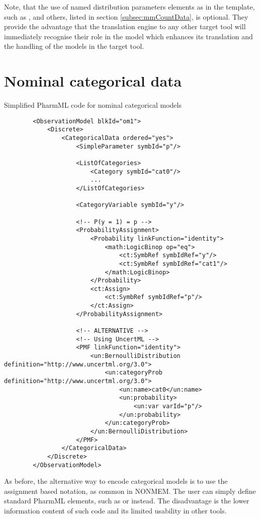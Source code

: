 Note, that the use of named distribution parameters elements as in the template, 
such as ,  and others, listed in section 
\ref{subsec:mmCountData}, is optional. 
They provide the advantage that the translation engine to any other target tool will immediately 
recognise their role in the model which enhances its translation and the handling of the models in the 
target tool.

\section{Nominal categorical data}
Simplified PharmML code for nominal categorical models
\lstset{language=XML}
\begin{lstlisting}
        <ObservationModel blkId="om1">
            <Discrete>
                <CategoricalData ordered="yes">
                    <SimpleParameter symbId="p"/>
                    
                    <ListOfCategories> 
                        <Category symbId="cat0"/>
                        ...
                    </ListOfCategories>
                    
                    <CategoryVariable symbId="y"/>
                    
                    <!-- P(y = 1) = p -->
                    <ProbabilityAssignment>
                        <Probability linkFunction="identity">
                            <math:LogicBinop op="eq">
                                <ct:SymbRef symbIdRef="y"/>
                                <ct:SymbRef symbIdRef="cat1"/>
                            </math:LogicBinop>
                        </Probability>
                        <ct:Assign>
                            <ct:SymbRef symbIdRef="p"/>
                        </ct:Assign>
                    </ProbabilityAssignment>
                    
                    <!-- ALTERNATIVE -->
                    <!-- Using UncertML -->
                    <PMF linkFunction="identity">
                        <un:BernoulliDistribution definition="http://www.uncertml.org/3.0">
                            <un:categoryProb definition="http://www.uncertml.org/3.0">
                                <un:name>cat0</un:name>
                                <un:probability>
                                    <un:var varId="p"/>
                                </un:probability>
                            </un:categoryProb>
                        </un:BernoulliDistribution>
                    </PMF>  
                </CategoricalData>
            </Discrete>
        </ObservationModel>
\end{lstlisting}
As before, the alternative way to encode categorical models is to use 
the assignment based notation, as common 
in NONMEM. The user can simply define standard PharmML elements, such as  or 
 instead. The disadvantage is the lower information content of such code and its limited
usability in other tools.

